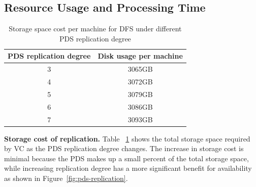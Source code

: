 



\subsection{Resource Usage and Processing Time}
\begin{table}
    \begin{tabular}{|c|c|}
    \hline
    PDS replication degree & Disk usage per machine  \\ \hline
    3                      & 3065GB             \\ \hline
    4                      & 3072GB             \\ \hline
    5                      & 3079GB             \\ \hline
    6                      & 3086GB             \\ \hline
    7                      & 3093GB             \\ \hline
    \end{tabular}
\caption{Storage space cost per machine for DFS under different PDS replication degree}
\label{tab:replication_cost}
\end{table}

{\bf Storage cost of replication.} Table ~\ref{tab:replication_cost} shows the total storage space required by 
VC as the PDS replication degree changes. The increase in storage cost is minimal because the PDS makes up a 
small percent of the total storage space, while increasing replication degree has a  more significant benefit for
availability as shown in Figure~\ref{fig:pds-replication}.

